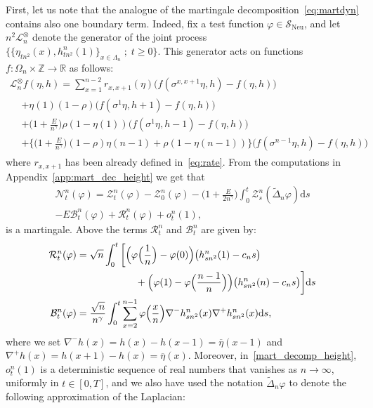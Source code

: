 \documentclass[AHL,Unicode,longabstracts]{cedram}
\DeclareMathOperator{\Neu}{Neu}
\newcommand{\bb}[1]{{\mathbb #1}}
\newcommand{\mc}[1]{{\mathcal #1}}
\renewcommand{\mc}[1]{{\mathcal #1}}
\renewcommand{\bar}{\overline}
\renewcommand{\geq}{\geqslant}
\renewcommand{\tilde}{\widetilde}
\newcommand*{\dd}{\mathrm{d}}
\newcommand*{\ds}{\dd s}
\renewcommand{\tfrac}{\frac}
\begin{document}
First, let us note that the analogue of the martingale decomposition~\eqref{eq:martdyn} contains also one boundary term. Indeed, fix a test function $\varphi\in\mc S_{\Neu}$, and let $n^2\mc L_n^{\otimes}$ denote the generator of the joint process $\big\{ \{\eta_{tn^2}(x),h_{{t n^2}}^n(1)\}_{x\in\Lambda_n}\; ; \; t\geq 0 \big\}$. This generator acts on functions $f:\Omega_n \times \bb Z \to \bb R$ as follows:
\begin{multline}
\mc L_n^\otimes f(\eta,h) = \sum_{x=1}^{n-2} r_{x,x+1}(\eta) \Big(f(\sigma^{x,x+1}\eta,h)-f(\eta,h)\Big)\\
\begin{aligned}
& +\eta(1)(1-\rho)\Big(f(\sigma^1\eta,h+1)-f(\eta,h)\Big) \\
& +\Big(1+\frac{E}{n^\gamma}\Big)\rho(1-\eta(1))\Big(f(\sigma^1\eta,h-1)-f(\eta,h)\Big)\\
& + \Big\{\Big(1+\frac{E}{n^\gamma}\Big)(1-\rho)\eta(n-1)+\rho(1-\eta(n-1))\Big\}\Big(f(\sigma^{n-1}\eta,h)-f(\eta,h)\Big)
\label{eq:joint_gen}
\end{aligned}
\end{multline}
where $r_{x,x+1}$ has been already defined in~\eqref{eq:rate}. From the computations in Appendix~\ref{app:mart_dec_height} we get that
\begin{multline}
\mc N_t^n(\varphi)= \mathcal{Z}_t^n(\varphi)-\mathcal{Z}_0^n(\varphi)-\Big(1+\frac{E}{2n^\gamma}\Big)\int_0^t\mc Z_s^n(\tilde\Delta_n\varphi) \ds\\ - E{\mc B_t^n(\varphi)}+{\mc R_t^n(\varphi)}+o^n_t(1),\label{mart_decomp_height}
\end{multline}
is a martingale. Above the terms $\mc R_t^n$ and $\mc B_t^n$ are given by:
\begin{align}\label{eq:height-remainder_new}
\mc R^n_t(\varphi) &= \sqrt n \int_0^t \bigg[\Big(\varphi \Big(\tfrac{1}{n} \Big) - \varphi (0) \Big) \big(h^n_{{sn^2}}(1)-c_n s\big) \\
& \qquad \qquad \qquad +\Big(\varphi (1) - \varphi \Big(\tfrac{n - 1}{n} \Big) \Big)
\big(h^n_{{sn^2}} (n)-c_ns\big)\bigg] \ds \notag\\
\mc B^n_t(\varphi) &= \frac{\sqrt n}{n^\gamma} \int_0^t\sum_{x = 2}^{n-1} \varphi \Big(\tfrac{x}{n} \Big) \nabla^- h^n_{{sn^2}} (x) \nabla^+ h^n_{{sn^2}} (x) \ds, \notag
\end{align}
where we set $\nabla^- h(x) = h(x) - h(x-1) =\bar\eta(x-1)$ and $\nabla^+ h(x) = h(x+1) - h(x) =\bar\eta(x)$. Moreover, in~\eqref{mart_decomp_height}, $o^n_t(1)$ is a deterministic sequence of real numbers that vanishes as $n\to \infty$, uniformly in $t\in[0,T]$, and we also have used the notation $\tilde\Delta_n\varphi$ to denote the following approximation of the Laplacian:
\end{document}
